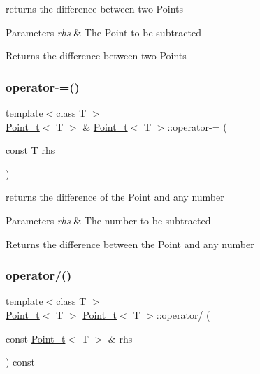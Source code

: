 returns the difference between two Points 


\begin{DoxyParams}{Parameters}
{\em rhs} & The Point to be subtracted\\
\hline
\end{DoxyParams}
\begin{DoxyReturn}{Returns}
the difference between two Points 
\end{DoxyReturn}
\mbox{\label{class_point__t_a52e5fc5e911f05b8e88fd918110dd502}} 
\subsubsection{\texorpdfstring{operator-\/=()}{operator-=()}\hspace{0.1cm}{\footnotesize\ttfamily [2/2]}}
{\footnotesize\ttfamily template$<$class T $>$ \\
\hyperlink{class_point__t}{Point\+\_\+t}$<$ T $>$ \& \hyperlink{class_point__t}{Point\+\_\+t}$<$ T $>$\+::operator-\/= (\begin{DoxyParamCaption}\item[{const T}]{rhs }\end{DoxyParamCaption})}



returns the difference of the Point and any number 


\begin{DoxyParams}{Parameters}
{\em rhs} & The number to be subtracted\\
\hline
\end{DoxyParams}
\begin{DoxyReturn}{Returns}
the difference between the Point and any number 
\end{DoxyReturn}
\mbox{\label{class_point__t_a8ee1a27bc0d6386c7af20006956cab41}} 
\subsubsection{\texorpdfstring{operator/()}{operator/()}\hspace{0.1cm}{\footnotesize\ttfamily [1/2]}}
{\footnotesize\ttfamily template$<$class T $>$ \\
\hyperlink{class_point__t}{Point\+\_\+t}$<$ T $>$ \hyperlink{class_point__t}{Point\+\_\+t}$<$ T $>$\+::operator/ (\begin{DoxyParamCaption}\item[{const \hyperlink{class_point__t}{Point\+\_\+t}$<$ T $>$ \&}]{rhs }\end{DoxyParamCaption}) const}



